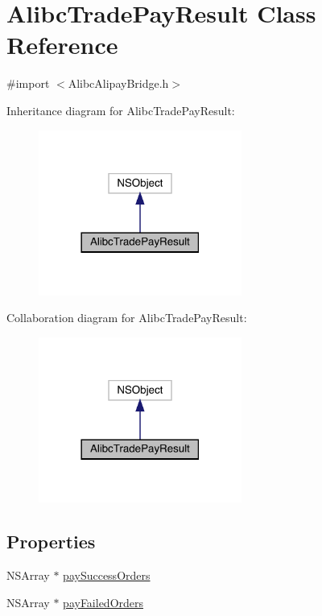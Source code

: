 \hypertarget{interface_alibc_trade_pay_result}{}\section{Alibc\+Trade\+Pay\+Result Class Reference}
\label{interface_alibc_trade_pay_result}


{\ttfamily \#import $<$Alibc\+Alipay\+Bridge.\+h$>$}



Inheritance diagram for Alibc\+Trade\+Pay\+Result\+:\nopagebreak
\begin{figure}[H]
\begin{center}
\leavevmode
\includegraphics[width=189pt]{interface_alibc_trade_pay_result__inherit__graph}
\end{center}
\end{figure}


Collaboration diagram for Alibc\+Trade\+Pay\+Result\+:\nopagebreak
\begin{figure}[H]
\begin{center}
\leavevmode
\includegraphics[width=189pt]{interface_alibc_trade_pay_result__coll__graph}
\end{center}
\end{figure}
\subsection*{Properties}
\begin{DoxyCompactItemize}
\item 
N\+S\+Array $\ast$ \mbox{\hyperlink{interface_alibc_trade_pay_result_a53051799e2e925b0fa2b7916bbd84769}{pay\+Success\+Orders}}
\item 
N\+S\+Array $\ast$ \mbox{\hyperlink{interface_alibc_trade_pay_result_a8b62bbeaa38edb1b3db757c3c8c7625a}{pay\+Failed\+Orders}}
\end{DoxyCompactItemize}


